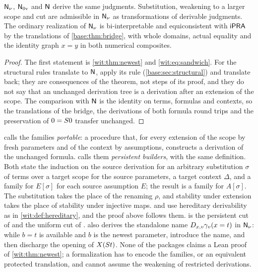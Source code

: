 \begin{corollary}
\label{wit:cor:structural}
$\mathsf{N}_{\nu}$, $\mathsf{N}_{0\mathrm v}$ and $\mathsf{N}$ derive the same judgments.
Substitution, weakening to a larger scope and cut are admissible in
$\mathsf{N}_{\nu}$ as transformations of derivable judgments.  The ordinary
realization of $\mathsf{N}_{\nu}$ is bi-interpretable and equiconsistent with
$\mathsf{iPRA}$ by the translations of \cref{base:thm:bridge}, with whole domains,
actual equality and the identity graph $x=y$ in both numerical composites.
\end{corollary}

\begin{proof}
The first statement is \cref{wit:thm:newest} and \eqref{wit:eq:sandwich}.
For the structural rules translate to $\mathsf{N}$, apply its rule
(\cref{base:sec:structural}) and translate back; they are consequences of
the theorem, not steps of its proof, and they do not say that an unchanged
derivation tree is a derivation after an extension of the scope.  The
comparison with $\mathsf{N}$ is the identity on terms, formulas and contexts, so
the translations of the bridge, the derivations of both formula round trips
and the preservation of $0=S 0$ transfer unchanged.
\end{proof}

\begin{remark}
\label{wit:rem:families}
 calls the families \emph{portable}: a procedure that, for
every extension of the scope by fresh parameters and of the context by
assumptions, constructs a derivation of the unchanged formula.
 calls them \emph{persistent builders}, with the same
definition.  Both state the induction on the source derivation for an
arbitrary substitution $\sigma$ of terms over a target scope for the source
parameters, a target context $\Delta$, and a family for $E[\sigma]$ for each
source assumption $E$; the result is a family for $A[\sigma]$.  The
substitution takes the place of the renaming $\rho$, and stability under
extension takes the place of stability under injective maps.
 and  use hereditary derivability
as in \cref{wit:def:hereditary}, and the proof above follows them.
 is the persistent cut of
 and the uniform cut of .
 also derives the standalone name
$D_{x,v}\gamma_v(x=t)$ in $\mathsf{N}_{\nu}$: while $b=t$ is available and $b$ is
the newest parameter, introduce the name, and then discharge the opening of
$X(S t)$.  None of the packages claims a Lean proof of
\cref{wit:thm:newest}; a formalization has to encode the families, or an
equivalent protected translation, and cannot assume the weakening of
restricted derivations.
\end{remark}

